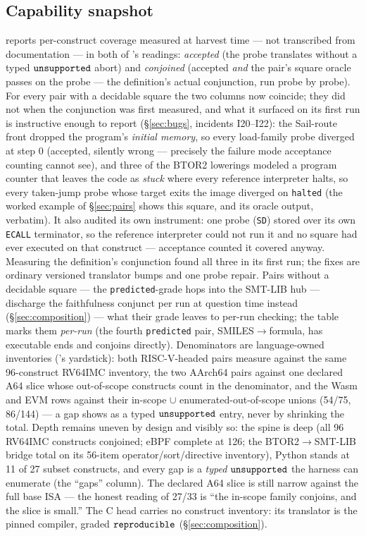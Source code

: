 \subsection{Capability snapshot}
\label{sec:eval-capability}



 reports per-construct coverage measured at
harvest time --- not transcribed from documentation --- in both of
's readings: \emph{accepted} (the probe translates
without a typed $\mathtt{unsupported}$ abort) and \emph{conjoined} (accepted
\emph{and} the pair's square oracle passes on the probe --- the
definition's actual conjunction, run probe by probe). For every pair
with a decidable square the two columns now coincide; they did not
when the conjunction was first measured, and what it surfaced on its
first run is instructive enough to report
(\S\ref{sec:bugs}, incidents I20--I22): the Sail-route front dropped
the program's \emph{initial memory}, so every load-family probe
diverged at step 0 (accepted, silently wrong --- precisely the failure
mode acceptance counting cannot see), and three of the BTOR2 lowerings
modeled a program counter that leaves the code as \emph{stuck} where
every reference interpreter halts, so every taken-jump probe whose
target exits the image diverged on \texttt{halted} (the worked example
of \S\ref{sec:pairs} shows this square, and its oracle output, verbatim). It also audited its
own instrument: one probe (\texttt{SD}) stored over its own
\texttt{ECALL} terminator, so the reference interpreter could not run
it and no square had ever executed on that construct --- acceptance
counted it covered anyway. Measuring the
definition's conjunction found all three in its first run; the fixes
are ordinary versioned translator bumps and one probe repair. Pairs without a decidable square
--- the \texttt{predicted}-grade hops into the SMT-LIB hub --- discharge
the faithfulness
conjunct per run at question time instead (\S\ref{sec:composition}) ---
what their grade leaves to per-run checking; the table marks them
\emph{per-run} (the fourth \texttt{predicted} pair,
SMILES$\to$formula, has executable ends and conjoins directly). Denominators are language-owned inventories
('s yardstick): both RISC-V-headed pairs measure
against the same 96-construct RV64IMC inventory, the two AArch64 pairs
against one declared A64 slice whose out-of-scope constructs count in
the denominator, and the Wasm and EVM rows against their in-scope
$\cup$ enumerated-out-of-scope unions (54/75, 86/144) --- a gap shows
as a typed $\mathtt{unsupported}$ entry, never by shrinking the total. Depth
remains uneven by design and visibly so: the spine is deep (all 96
RV64IMC constructs conjoined; eBPF complete at 126; the
BTOR2$\to$SMT-LIB bridge total on its 56-item
operator/sort/directive inventory), Python stands at 11 of 27 subset
constructs, and every gap is a \emph{typed} $\mathtt{unsupported}$ the harness
can enumerate (the ``gaps'' column). The declared A64 slice is still
narrow against the full base ISA --- the honest reading of 27/33 is
``the in-scope family conjoins, and the slice is small.'' The C head
carries no construct inventory: its translator is the pinned compiler,
graded $\mathtt{reproducible}$ (\S\ref{sec:composition}).

